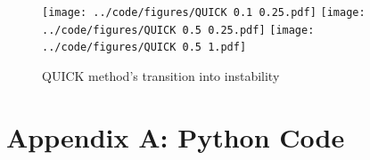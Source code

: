 \documentclass[twocolumn,10pt]{asme2ej}
\begin{document}
\begin{figure}[thb]
\begin{center}
\texttt{[image: ../code/figures/QUICK 0.1 0.25.pdf]}
\texttt{[image: ../code/figures/QUICK 0.5 0.25.pdf]}
\texttt{[image: ../code/figures/QUICK 0.5 1.pdf]}
\caption{QUICK method's transition into instability}
\label{QUICK_transition}
\end{center}
\end{figure}

\clearpage
\onecolumn
\appendix       %
\section*{Appendix A: Python Code}




\end{document}
